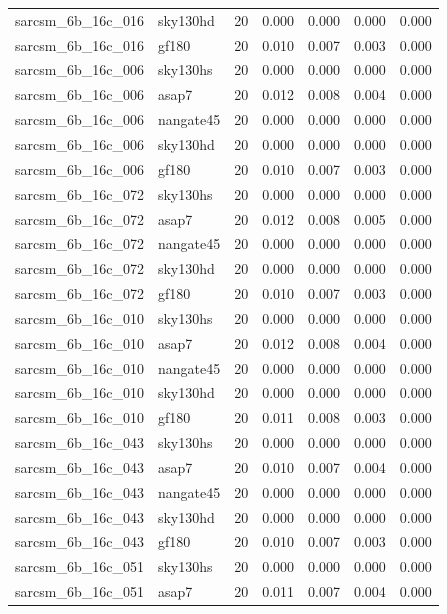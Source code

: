\begin{tabular}{llrrrrr}
sarcsm\_6b\_16c\_016 & sky130hd & 20 & 0.000 & 0.000 & 0.000 & 0.000 \\
sarcsm\_6b\_16c\_016 & gf180 & 20 & 0.010 & 0.007 & 0.003 & 0.000 \\
sarcsm\_6b\_16c\_006 & sky130hs & 20 & 0.000 & 0.000 & 0.000 & 0.000 \\
sarcsm\_6b\_16c\_006 & asap7 & 20 & 0.012 & 0.008 & 0.004 & 0.000 \\
sarcsm\_6b\_16c\_006 & nangate45 & 20 & 0.000 & 0.000 & 0.000 & 0.000 \\
sarcsm\_6b\_16c\_006 & sky130hd & 20 & 0.000 & 0.000 & 0.000 & 0.000 \\
sarcsm\_6b\_16c\_006 & gf180 & 20 & 0.010 & 0.007 & 0.003 & 0.000 \\
sarcsm\_6b\_16c\_072 & sky130hs & 20 & 0.000 & 0.000 & 0.000 & 0.000 \\
sarcsm\_6b\_16c\_072 & asap7 & 20 & 0.012 & 0.008 & 0.005 & 0.000 \\
sarcsm\_6b\_16c\_072 & nangate45 & 20 & 0.000 & 0.000 & 0.000 & 0.000 \\
sarcsm\_6b\_16c\_072 & sky130hd & 20 & 0.000 & 0.000 & 0.000 & 0.000 \\
sarcsm\_6b\_16c\_072 & gf180 & 20 & 0.010 & 0.007 & 0.003 & 0.000 \\
sarcsm\_6b\_16c\_010 & sky130hs & 20 & 0.000 & 0.000 & 0.000 & 0.000 \\
sarcsm\_6b\_16c\_010 & asap7 & 20 & 0.012 & 0.008 & 0.004 & 0.000 \\
sarcsm\_6b\_16c\_010 & nangate45 & 20 & 0.000 & 0.000 & 0.000 & 0.000 \\
sarcsm\_6b\_16c\_010 & sky130hd & 20 & 0.000 & 0.000 & 0.000 & 0.000 \\
sarcsm\_6b\_16c\_010 & gf180 & 20 & 0.011 & 0.008 & 0.003 & 0.000 \\
sarcsm\_6b\_16c\_043 & sky130hs & 20 & 0.000 & 0.000 & 0.000 & 0.000 \\
sarcsm\_6b\_16c\_043 & asap7 & 20 & 0.010 & 0.007 & 0.004 & 0.000 \\
sarcsm\_6b\_16c\_043 & nangate45 & 20 & 0.000 & 0.000 & 0.000 & 0.000 \\
sarcsm\_6b\_16c\_043 & sky130hd & 20 & 0.000 & 0.000 & 0.000 & 0.000 \\
sarcsm\_6b\_16c\_043 & gf180 & 20 & 0.010 & 0.007 & 0.003 & 0.000 \\
sarcsm\_6b\_16c\_051 & sky130hs & 20 & 0.000 & 0.000 & 0.000 & 0.000 \\
sarcsm\_6b\_16c\_051 & asap7 & 20 & 0.011 & 0.007 & 0.004 & 0.000 \\

\end{tabular}
